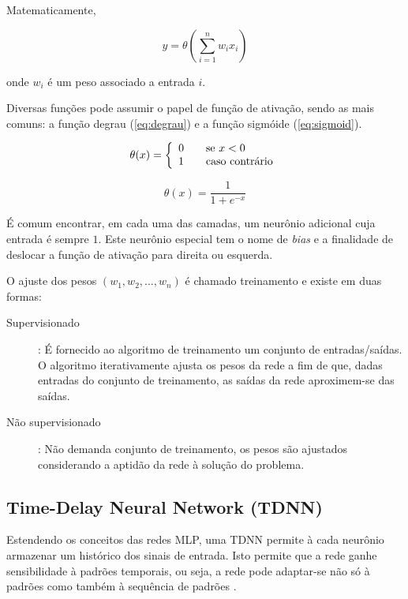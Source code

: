 Matematicamente,

\[ y = \theta ( \sum_{i=1}^{n} w_i x_i ) \]

onde \(w_i\) é um peso associado a entrada \(i\).

Diversas funções pode assumir o papel de função de ativação, sendo as mais comuns:
a função degrau (\ref{eq:degrau}) e a função sigmóide (\ref{eq:sigmoid}).

\begin{equation} \label{eq:degrau}
    \theta(x) = \left\{
    \begin{array}{l l}
        0 & \quad \text{se } x < 0\\
        1 & \quad \text{caso contrário}
    \end{array} \right.
\end{equation}

\begin{equation} \label{eq:sigmoid}
    \theta(x) = \frac{1}{1 + e^{-x}}
\end{equation}

É comum encontrar, em cada uma das camadas, um neurônio adicional cuja entrada é sempre \(1\). Este neurônio especial tem o nome de \textit{bias} e a finalidade de deslocar a função de ativação para direita ou esquerda.

O ajuste dos pesos \((w_1, w_2, \dots , w_n)\) é chamado treinamento e existe em duas formas:

\begin{description}
    \item[Supervisionado]: É fornecido ao algoritmo de treinamento um conjunto de entradas/saídas. O algoritmo iterativamente ajusta os pesos da rede a fim de que, dadas entradas do conjunto de treinamento, as saídas da rede aproximem-se das saídas.
    \item[Não supervisionado]: Não demanda conjunto de treinamento, os pesos
são ajustados considerando a aptidão da rede à solução do problema.
\end{description}

\subsection{Time-Delay Neural Network (TDNN)}

Estendendo os conceitos das redes MLP, uma TDNN permite à cada neurônio armazenar um
histórico dos sinais de entrada. Isto permite que a rede ganhe sensibilidade à padrões temporais, ou seja, a rede pode adaptar-se não só à padrões como também à sequência de padrões \cite{kaiser94tdnn}.

